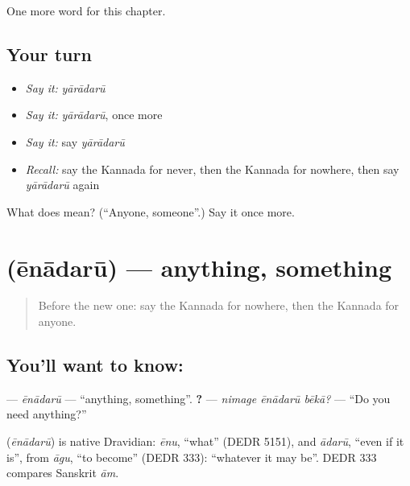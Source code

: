 \begin{grammarlens}[title={What you've built}]
One more word for this chapter.
\end{grammarlens}

\subsection*{Your turn}
\begin{itemize}
\raggedright
  \item \emph{Say it:} \emph{yārādarū}
  \item \emph{Say it:} \emph{yārādarū}, once more
  \item \emph{Say it:} say \emph{yārādarū}
  \item \emph{Recall:} say the Kannada for never, then the Kannada for nowhere, then say \emph{yārādarū} again
\end{itemize}

\begin{tcolorbox}[breakable,colback=teal!4,colframe=teal!35!black,title={Before you move on}]
What does  mean? (\textquotedblleft{}Anyone, someone\textquotedblright{}.) Say it once more.
\end{tcolorbox}
\section[\texorpdfstring{\kn{ಏನಾದರೂ} (ēnādarū)}{ಏನಾದರೂ (ēnādarū)}]{ (ēnādarū) — anything, something}

\label{lesson:KA-C154-enadaru}



\begin{quote}
Before the new one: say the Kannada for nowhere, then the Kannada for anyone.
\end{quote}

\subsection*{You'll want to know: }
\textbf{} — \emph{ēnādarū} — \textquotedblleft{}anything, something\textquotedblright{}. \textbf{  ?} — \emph{nimage ēnādarū bēkā?} — \textquotedblleft{}Do you need anything?\textquotedblright{}

\begin{cousinweb}
\textbf{} (\emph{ēnādarū}) is native Dravidian: \emph{ēnu}, \textquotedblleft{}what\textquotedblright{} (DEDR 5151), and \emph{ādarū}, \textquotedblleft{}even if it is\textquotedblright{}, from \emph{āgu}, \textquotedblleft{}to become\textquotedblright{} (DEDR 333): \textquotedblleft{}whatever it may be\textquotedblright{}. DEDR 333 compares Sanskrit \emph{ām}.
\end{cousinweb}

